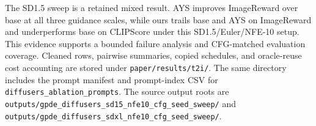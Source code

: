 The SD1.5 sweep is a retained mixed result. AYS improves ImageReward over base
at all three guidance scales, while ours trails base and AYS on ImageReward and
underperforms base on CLIPScore under this SD1.5/Euler/NFE-10 setup. This
evidence supports a bounded failure analysis and CFG-matched evaluation
coverage. Cleaned rows, pairwise summaries, copied schedules, and oracle-reuse
cost accounting are stored under \texttt{paper/results/t2i/}. The same
directory includes the prompt manifest and prompt-index CSV for
\texttt{diffusers\_ablation\_prompts}. The source output roots are
\texttt{outputs/gpde\_diffusers\_sd15\_nfe10\_cfg\_seed\_sweep/} and
\texttt{outputs/gpde\_diffusers\_sdxl\_nfe10\_cfg\_seed\_sweep/}.
